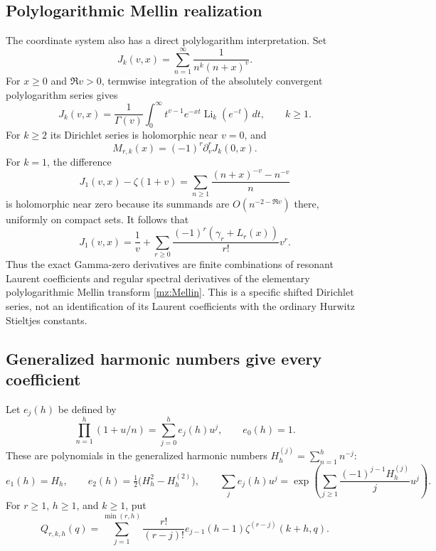 \documentclass[11pt,letterpaper]{article}
\numberwithin{equation}{section}
\theoremstyle{plain}
\theoremstyle{definition}
\theoremstyle{remark}
\begin{document}
\subsection{Polylogarithmic Mellin realization}

The coordinate system also has a direct polylogarithm interpretation. Set
\begin{equation}
 J_k(v,x)=\sum_{n=1}^{\infty}\frac1{n^k(n+x)^v}.
 \label{mz:J}
\end{equation}
For $x\ge0$ and $\Re v>0$, termwise integration of the absolutely
convergent polylogarithm series gives
\begin{equation}
 J_k(v,x)=\frac1{\Gamma(v)}\int_0^{\infty}
     t^{v-1}e^{-xt}\operatorname{Li}_k(e^{-t})\,dt,
       \qquad k\ge1.
 \label{mz:Mellin}
\end{equation}
For $k\ge2$ its Dirichlet series is holomorphic near $v=0$, and
\[
 M_{r,k}(x)=(-1)^r\partial_v^rJ_k(0,x).
\]
For $k=1$, the difference
\[
 J_1(v,x)-\zeta(1+v)
 =\sum_{n\ge1}\frac{(n+x)^{-v}-n^{-v}}n
\]
is holomorphic near zero because its summands are $O(n^{-2-\Re v})$
there, uniformly on compact sets. It follows that
\begin{equation}
 J_1(v,x)=\frac1v+
       \sum_{r\ge0}\frac{(-1)^r(\gamma_r+L_r(x))}{r!}v^r.
 \label{mz:JLaurent}
\end{equation}
Thus the exact Gamma-zero derivatives are finite combinations of resonant
Laurent coefficients and regular spectral derivatives of the elementary
polylogarithmic Mellin transform \eqref{mz:Mellin}. This is a specific
shifted Dirichlet series, not an identification of its Laurent coefficients
with the ordinary Hurwitz Stieltjes constants.

\subsection{Generalized harmonic numbers give every coefficient}

Let $e_j(h)$ be defined by
\begin{equation}
 \prod_{n=1}^{h}(1+u/n)=\sum_{j=0}^{h}e_j(h)u^j,
 \qquad e_0(h)=1.
 \label{mz:e}
\end{equation}
These are polynomials in the generalized harmonic numbers
$H_h^{(j)}=\sum_{n=1}^h n^{-j}$:
\[
 e_1(h)=H_h,\qquad
 e_2(h)=\tfrac12\bigl(H_h^2-H_h^{(2)}\bigr),\qquad
 \sum_j e_j(h)u^j
  =\exp\left(\sum_{j\ge1}\frac{(-1)^{j-1}H_h^{(j)}}j u^j\right).
\]
For $r\ge1$, $h\ge1$, and $k\ge1$, put
\begin{equation}
 Q_{r,k,h}(q)
   =\sum_{j=1}^{\min(r,h)}\frac{r!}{(r-j)!}
           e_{j-1}(h-1)\zeta^{(r-j)}(k+h,q).
 \label{mz:Q}
\end{equation}
\end{document}
